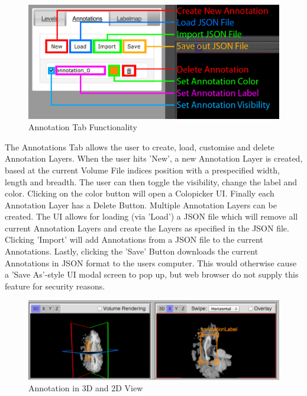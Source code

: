 \documentclass[a4paper,11pt,titlepage]{article}
\begin{document}
\begin{figure}[ht!]
\centering
\includegraphics[width=140mm]{graphics/features_05.png}
\caption{Annotation Tab Functionality}
\label{fig:UIdesign1}
\end{figure}

The Annotations Tab allows the user to create, load, customise and delete Annotation Layers. When the user hits 'New', a new Annotation Layer is created, based at the current Volume File indices position with a prespecified width, length and breadth. The user can then toggle the visibility, change the label and color. Clicking on the color button will open a Colopicker UI. Finally each Annotation Layer has a Delete Button. Multiple Annotation Layers can be created. The UI allows for loading (via 'Load') a JSON file which will remove all current Annotation Layers and create the Layers as specified in the JSON file. Clicking 'Import' will add Annotations from a JSON file to the current Annotations. Lastly, clicking the 'Save' Button downloads the current Annotations in JSON format to the users computer. This would otherwise cause a 'Save As'-style UI modal screen to pop up, but web browser do not supply this feature for security reasons.



\begin{figure}[ht!]
\centering
\includegraphics[width=170mm]{graphics/AnnotationFinal_01.png}
\caption{Annotation in 3D and 2D View}
\label{fig:UIdesign1}
\end{figure}
\end{document}
